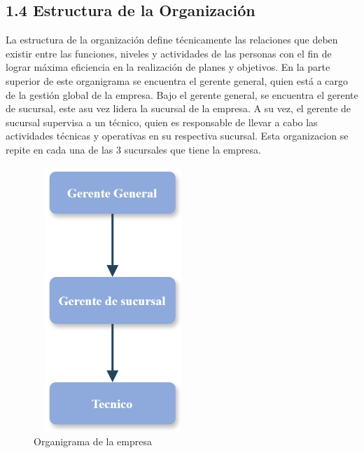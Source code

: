 \subsection{1.4 Estructura de la Organización}
La estructura de la organización define técnicamente las relaciones que deben existir entre las funciones, niveles y actividades de las personas con el fin de lograr máxima eficiencia en la realización de planes y objetivos.
En la parte superior de este organigrama se encuentra el gerente general, quien está a cargo de la gestión global de la empresa. Bajo el gerente general, se encuentra el gerente de sucursal, este asu vez lidera la sucursal de la empresa. A su vez, el gerente de sucursal supervisa a un técnico, quien es responsable de llevar a cabo las actividades técnicas y operativas en su respectiva sucursal. Esta organizacion se repite en cada una de las 3 sucursales que tiene la empresa.

%    

\begin{figure}[H]
    \centering
    \caption{Organigrama de la empresa}
    \label{organigrama}
    \includegraphics[width=6cm, height=10cm]{imagenes/cap1/Organigrama123.jpg}
\end{figure}

